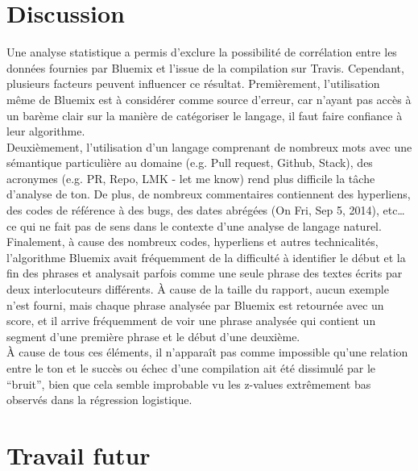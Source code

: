 \documentclass[10pt, conference]{IEEEtran}
\begin{document}
\section{Discussion}
\label{sec:discussion}

Une analyse statistique a permis d’exclure la possibilité de corrélation entre les données fournies par Bluemix et l'issue de la compilation sur Travis. Cependant, plusieurs facteurs peuvent influencer ce résultat.
Premièrement, l’utilisation même de Bluemix est à considérer comme source d’erreur, car n’ayant pas accès à un barème clair sur la manière de catégoriser le langage, il faut faire confiance à leur algorithme. \\
Deuxièmement, l’utilisation d’un langage comprenant de nombreux mots avec une sémantique particulière au domaine (e.g. Pull request, Github, Stack), des acronymes (e.g. PR, Repo, LMK - let me know) rend plus difficile la tâche d’analyse de ton. De plus, de nombreux commentaires contiennent des hyperliens, des codes de référence à des bugs, des dates abrégées (On Fri, Sep 5, 2014), etc… ce qui ne fait pas de sens dans le contexte d’une analyse de langage naturel. \\
Finalement, à cause des nombreux codes, hyperliens et autres technicalités, l’algorithme Bluemix avait fréquemment de la difficulté à identifier le début et la fin des phrases et analysait parfois comme une seule phrase des textes écrits par deux interlocuteurs différents. À cause de la taille du rapport, aucun exemple n’est fourni, mais chaque phrase analysée par Bluemix est retournée avec un score, et il arrive fréquemment de voir une phrase analysée qui contient un segment d’une première phrase et le début d’une deuxième. \\
À cause de tous ces éléments, il n'apparaît pas comme impossible qu’une relation entre le ton et le succès ou échec d’une compilation ait été dissimulé par le “bruit”, bien que cela semble improbable vu les z-values extrêmement bas observés dans la régression logistique.


\section{Travail futur}
\label{sec:future}
\end{document}
